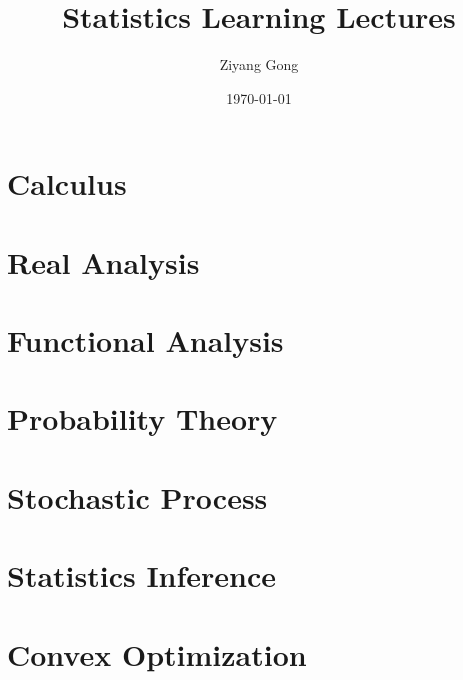 \documentclass[pad,12pt,mtpro2]{elegantbook}
\title{Statistics Learning Lectures}
\author{Ziyang Gong}
\date{\today}
\begin{document}
\maketitle
\tableofcontents

\mainmatter
\hypersetup{pageanchor=true}

\part{Calculus}




\part{Real Analysis}



\part{Functional Analysis}

\part{Probability Theory}







\part{Stochastic Process}





\part{Statistics Inference}






\part{Convex Optimization}




\end{document}
